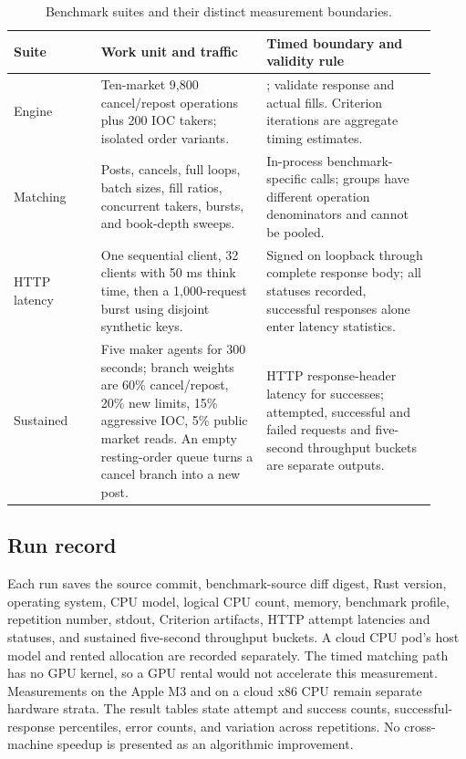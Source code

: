 \documentclass[envcountsame,runningheads,notitlepage]{llncs}
\newcommand{\pathref}[1]{\texttt{\detokenize{#1}}}
\begin{document}
\begin{table}[h]
\centering\small
\begin{tabular}{>{\raggedright\arraybackslash}p{0.19\linewidth}>{\raggedright\arraybackslash}p{0.36\linewidth}>{\raggedright\arraybackslash}p{0.37\linewidth}}
\toprule
Suite & Work unit and traffic & Timed boundary and validity rule \\
\midrule
Engine & Ten-market 9,800 cancel/repost operations plus 200 IOC takers; isolated order variants. & \pathref{MatchingEngine::process}; validate response and actual fills. Criterion iterations are aggregate timing estimates. \\
Matching & Posts, cancels, full loops, batch sizes, fill ratios, concurrent takers, bursts, and book-depth sweeps. & In-process benchmark-specific calls; groups have different operation denominators and cannot be pooled. \\
HTTP latency & One sequential client, 32 clients with 50 ms think time, then a 1,000-request burst using disjoint synthetic keys. & Signed \pathref{POST /orders} on loopback through complete response body; all statuses recorded, successful responses alone enter latency statistics. \\
Sustained & Five maker agents for 300 seconds; branch weights are 60\% cancel/repost, 20\% new limits, 15\% aggressive IOC, 5\% public market reads. An empty resting-order queue turns a cancel branch into a new post. & HTTP response-header latency for successes; attempted, successful and failed requests and five-second throughput buckets are separate outputs. \\
\bottomrule
\end{tabular}
\caption{Benchmark suites and their distinct measurement boundaries.}
\end{table}

\subsection{Run record}
Each run saves the source commit, benchmark-source diff digest, Rust version, operating system, CPU model, logical CPU count, memory, benchmark profile, repetition number, stdout, Criterion artifacts, HTTP attempt latencies and statuses, and sustained five-second throughput buckets. A cloud CPU pod's host model and rented allocation are recorded separately. The timed matching path has no GPU kernel, so a GPU rental would not accelerate this measurement. Measurements on the Apple M3 and on a cloud x86 CPU remain separate hardware strata. The result tables state attempt and success counts, successful-response percentiles, error counts, and variation across repetitions. No cross-machine speedup is presented as an algorithmic improvement.
\end{document}
